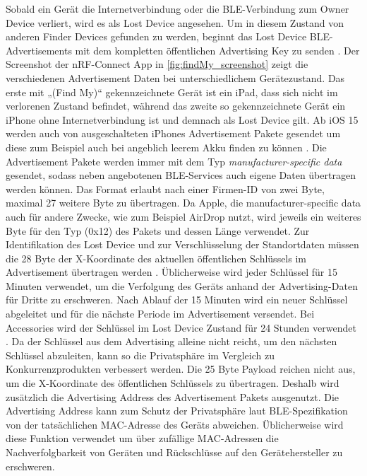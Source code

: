 Sobald ein Gerät die Internetverbindung oder die \ac{BLE}-Verbindung zum Owner Device verliert, wird es als Lost Device angesehen.
Um in diesem Zustand von anderen Finder Devices gefunden zu werden, beginnt das Lost Device \ac{BLE}-Advertisements mit dem kompletten öffentlichen Advertising Key zu senden \cite{Apple_FindMySpec}.
Der Screenshot der nRF-Connect App in \autoref{fig:findMy_screenshot} zeigt die verschiedenen Advertisement Daten bei unterschiedlichem Gerätezustand.
Das erste mit „(Find My)“ gekennzeichnete Gerät ist ein iPad, dass sich nicht im verlorenen Zustand befindet, während das zweite so gekennzeichnete Gerät ein iPhone ohne Internetverbindung ist und demnach als Lost Device gilt.
Ab iOS 15 werden auch von ausgeschalteten iPhones Advertisement Pakete gesendet um diese zum Beispiel auch bei angeblich leerem Akku finden zu können \cite{Classen_FindMy}.
Die Advertisement Pakete werden immer mit dem Typ \textit{manufacturer-specific data} gesendet, sodass neben angebotenen \ac{BLE}-Services auch eigene Daten übertragen werden können.
Das Format erlaubt nach einer Firmen-ID von zwei Byte, maximal 27 weitere Byte zu übertragen.
Da Apple, die manufacturer-specific data auch für andere Zwecke, wie zum Beispiel AirDrop nutzt, wird jeweils ein weiteres Byte für den Typ (0x12) des Pakets und dessen Länge verwendet.
Zur Identifikation des Lost Device und zur Verschlüsselung der Standortdaten müssen die 28 Byte der X-Koordinate des aktuellen öffentlichen Schlüssels im Advertisement übertragen werden \cite{Heinrich_FindMy}.
Üblicherweise wird jeder Schlüssel für 15 Minuten verwendet, um die Verfolgung des Geräts anhand der Advertising-Daten für Dritte zu erschweren.
Nach Ablauf der 15 Minuten wird ein neuer Schlüssel abgeleitet und für die nächste Periode im Advertisement versendet.
Bei Accessories wird der Schlüssel im Lost Device Zustand für 24 Stunden verwendet \cite{Mayberry_Tracking}.
Da der Schlüssel aus dem Advertising alleine nicht reicht, um den nächsten Schlüssel abzuleiten, kann so die Privatsphäre im Vergleich zu Konkurrenzprodukten verbessert werden.
Die 25 Byte Payload reichen nicht aus, um die X-Koordinate des öffentlichen Schlüssels zu übertragen.
Deshalb  wird zusätzlich die Advertising Address des Advertisement Pakets ausgenutzt.
Die Advertising Address kann zum Schutz der Privatsphäre laut \ac{BLE}-Spezifikation \cite{Spec_BLE_5.3} von der tatsächlichen \ac{MAC}-Adresse des Geräts abweichen.
Üblicherweise wird diese Funktion verwendet um über zufällige \ac{MAC}-Adressen die Nachverfolgbarkeit von Geräten und Rückschlüsse auf den Gerätehersteller zu erschweren.
